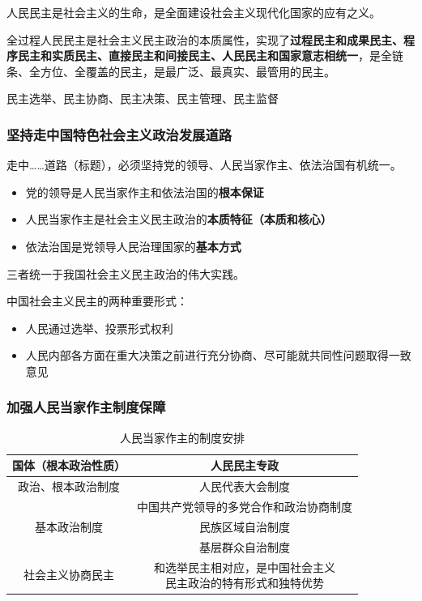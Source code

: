 \documentclass[12pt, a4paper, oneside]{ctexart}
\begin{document}
人民民主是社会主义的生命，是全面建设社会主义现代化国家的应有之义。

全过程人民民主是社会主义民主政治的本质属性，实现了\textbf{过程民主和成果民主、程序民主和实质民主、直接民主和间接民主、人民民主和国家意志相统一}，是全链条、全方位、全覆盖的民主，是最广泛、最真实、最管用的民主。

民主选举、民主协商、民主决策、民主管理、民主监督

\subsubsection{坚持走中国特色社会主义政治发展道路}

走中……道路（标题），必须坚持党的领导、人民当家作主、依法治国有机统一。
\begin{itemize}
  \item 党的领导是人民当家作主和依法治国的\textbf{根本保证}
  \item 人民当家作主是社会主义民主政治的\textbf{本质特征（本质和核心）}
  \item 依法治国是党领导人民治理国家的\textbf{基本方式}
\end{itemize}
三者统一于我国社会主义民主政治的伟大实践。

中国社会主义民主的两种重要形式：
\begin{itemize}
  \item 人民通过选举、投票形式权利
  \item 人民内部各方面在重大决策之前进行充分协商、尽可能就共同性问题取得一致意见
\end{itemize}

\subsubsection{加强人民当家作主制度保障}

\begin{table}
  \centering
  \caption{人民当家作主的制度安排}
  \begin{tabular}{|c|c|}
    \hline
    国体（根本政治性质） & 人民民主专政 \\ \hline
    政治、根本政治制度 & 人民代表大会制度 \\ \hline
    \multirow{3}{*}{基本政治制度} & 中国共产党领导的多党合作和政治协商制度 \\ \cline{2-2}
    & 民族区域自治制度 \\ \cline{2-2}
    & 基层群众自治制度 \\ \hline
    社会主义协商民主 & \makecell{和选举民主相对应，是中国社会主义\\ 民主政治的特有形式和独特优势} \\
    \hline
  \end{tabular}
\end{table}
\end{document}
